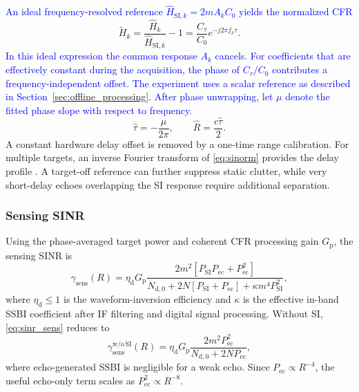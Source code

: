 \documentclass[10pt,journal]{IEEEtran}
\DeclareRobustCommand{\rev}[1]{\textcolor{blue}{#1}}
\begin{document}
\rev{An ideal frequency-resolved reference
$\widehat H_{\mathrm{SI},k}=2mA_kC_0$ yields the normalized CFR}
\begin{equation}
\widetilde H_k
=
\frac{\widehat H_k}{\widehat H_{\mathrm{SI},k}}-1
=
\frac{C_\tau}{C_0}e^{-j2\pi f_k\tau}.
\label{eq:sinorm}
\end{equation}
\rev{In this ideal expression the common response $A_k$ cancels. For
coefficients that are effectively constant during the acquisition,
the phase of $C_\tau/C_0$ contributes a frequency-independent offset.
The experiment uses a scalar reference as described in
Section~\ref{sec:offline_processing}. After phase unwrapping, let
$\mu$ denote the fitted phase slope with respect to frequency.}
\begin{equation}
\widehat\tau=-\frac{\mu}{2\pi},
\qquad
\widehat R=\frac{c\widehat\tau}{2}.
\label{eq:slope}
\end{equation}
A constant hardware delay offset is removed by a one-time range
calibration. For multiple targets, an inverse Fourier transform of
\eqref{eq:sinorm} provides the delay profile
\cite{sturm_waveform_2011}. A target-off reference can further suppress
static clutter, while very short-delay echoes overlapping the SI
response require additional separation.


\subsubsection{Sensing SINR}

Using the phase-averaged target power and coherent CFR processing gain
$G_{\mathrm p}$, the sensing SINR is
\begin{equation}
\gamma_{\mathrm{sens}}(R)
=
\eta_{\mathrm d}G_{\mathrm p}
\frac{
2m^2\!\left[
P_{\mathrm{SI}}P_{\mathrm{ec}}
+
P_{\mathrm{ec}}^2
\right]
}{
N_{\mathrm{d},0}
+
2N\!\left[
P_{\mathrm{SI}}+P_{\mathrm{ec}}
\right]
+
\kappa m^4P_{\mathrm{SI}}^2
},
\label{eq:sinr_sens}
\end{equation}
where $\eta_{\mathrm d}\leq1$ is the waveform-inversion efficiency and
$\kappa$ is the effective in-band SSBI coefficient after IF filtering
and digital signal processing. Without SI, \eqref{eq:sinr_sens} reduces to
\begin{equation}
\gamma_{\mathrm{sens}}^{\mathrm{w/o\,SI}}(R)
=
\eta_{\mathrm d}G_{\mathrm p}
\frac{
2m^2P_{\mathrm{ec}}^2
}{
N_{\mathrm{d},0}+2NP_{\mathrm{ec}}
},
\label{eq:sinr_nosi}
\end{equation}
where echo-generated SSBI is negligible for a weak echo. Since
$P_{\mathrm{ec}}\propto R^{-4}$, the useful echo-only term scales as
$P_{\mathrm{ec}}^2\propto R^{-8}$.
\end{document}
